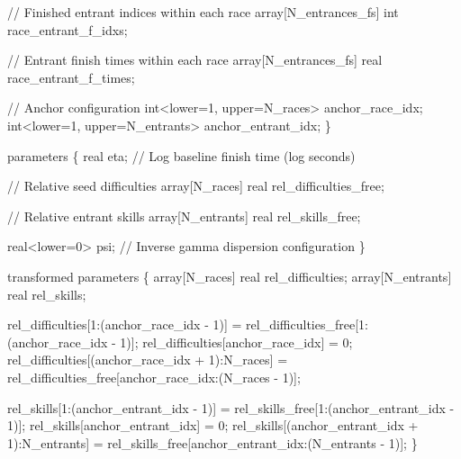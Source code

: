 \documentclass[
  letterpaper,
  DIV=11,
  numbers=noendperiod]{scrartcl}
\newenvironment{Shaded}{\begin{snugshade}}{\end{snugshade}}
\newcommand{\CommentTok}[1]{\textcolor[rgb]{0.37,0.37,0.37}{#1}}
\newcommand{\DataTypeTok}[1]{\textcolor[rgb]{0.68,0.00,0.00}{#1}}
\newcommand{\DecValTok}[1]{\textcolor[rgb]{0.68,0.00,0.00}{#1}}
\newcommand{\KeywordTok}[1]{\textcolor[rgb]{0.00,0.23,0.31}{#1}}
\newcommand{\NormalTok}[1]{\textcolor[rgb]{0.00,0.23,0.31}{#1}}
\begin{document}
\begin{codelisting}
\begin{Shaded}
\begin{Highlighting}[]
  \CommentTok{// Finished entrant indices within each race}
  \DataTypeTok{array}\NormalTok{[N\_entrances\_fs] }\DataTypeTok{int}\NormalTok{ race\_entrant\_f\_idxs;}

  \CommentTok{// Entrant finish times within each race}
  \DataTypeTok{array}\NormalTok{[N\_entrances\_fs] }\DataTypeTok{real}\NormalTok{ race\_entrant\_f\_times;}

  \CommentTok{// Anchor configuration}
  \DataTypeTok{int}\NormalTok{\textless{}}\KeywordTok{lower}\NormalTok{=}\DecValTok{1}\NormalTok{, }\KeywordTok{upper}\NormalTok{=N\_races\textgreater{} anchor\_race\_idx;}
  \DataTypeTok{int}\NormalTok{\textless{}}\KeywordTok{lower}\NormalTok{=}\DecValTok{1}\NormalTok{, }\KeywordTok{upper}\NormalTok{=N\_entrants\textgreater{} anchor\_entrant\_idx;}
\NormalTok{\}}

\KeywordTok{parameters}\NormalTok{ \{}
  \DataTypeTok{real}\NormalTok{ eta; }\CommentTok{// Log baseline finish time (log seconds)}

  \CommentTok{// Relative seed difficulties}
  \DataTypeTok{array}\NormalTok{[N\_races] }\DataTypeTok{real}\NormalTok{ rel\_difficulties\_free;}

  \CommentTok{// Relative entrant skills}
  \DataTypeTok{array}\NormalTok{[N\_entrants] }\DataTypeTok{real}\NormalTok{ rel\_skills\_free;}

  \DataTypeTok{real}\NormalTok{\textless{}}\KeywordTok{lower}\NormalTok{=}\DecValTok{0}\NormalTok{\textgreater{} psi; }\CommentTok{// Inverse gamma dispersion configuration}
\NormalTok{\}}

\KeywordTok{transformed parameters}\NormalTok{ \{}
  \DataTypeTok{array}\NormalTok{[N\_races] }\DataTypeTok{real}\NormalTok{ rel\_difficulties;}
  \DataTypeTok{array}\NormalTok{[N\_entrants] }\DataTypeTok{real}\NormalTok{ rel\_skills;}

\NormalTok{  rel\_difficulties[}\DecValTok{1}\NormalTok{:(anchor\_race\_idx {-} }\DecValTok{1}\NormalTok{)]}
\NormalTok{    =  rel\_difficulties\_free[}\DecValTok{1}\NormalTok{:(anchor\_race\_idx {-} }\DecValTok{1}\NormalTok{)];}
\NormalTok{  rel\_difficulties[anchor\_race\_idx] = }\DecValTok{0}\NormalTok{;}
\NormalTok{  rel\_difficulties[(anchor\_race\_idx + }\DecValTok{1}\NormalTok{):N\_races]}
\NormalTok{    = rel\_difficulties\_free[anchor\_race\_idx:(N\_races {-} }\DecValTok{1}\NormalTok{)];}

\NormalTok{  rel\_skills[}\DecValTok{1}\NormalTok{:(anchor\_entrant\_idx {-} }\DecValTok{1}\NormalTok{)]}
\NormalTok{    =  rel\_skills\_free[}\DecValTok{1}\NormalTok{:(anchor\_entrant\_idx {-} }\DecValTok{1}\NormalTok{)];}
\NormalTok{  rel\_skills[anchor\_entrant\_idx] = }\DecValTok{0}\NormalTok{;}
\NormalTok{  rel\_skills[(anchor\_entrant\_idx + }\DecValTok{1}\NormalTok{):N\_entrants]}
\NormalTok{    = rel\_skills\_free[anchor\_entrant\_idx:(N\_entrants {-} }\DecValTok{1}\NormalTok{)];}
\NormalTok{\}}


\end{Highlighting}
\end{Shaded}
\end{codelisting}
\end{document}

